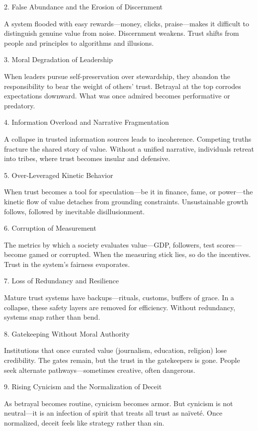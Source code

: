 \documentclass[11pt,oneside]{book}
\begin{document}
2. False Abundance and the Erosion of Discernment


A system flooded with easy rewards—money, clicks, praise—makes it difficult to distinguish genuine value from noise. Discernment weakens. Trust shifts from people and principles to algorithms and illusions.

3. Moral Degradation of Leadership


When leaders pursue self-preservation over stewardship, they abandon the responsibility to bear the weight of others’ trust. Betrayal at the top corrodes expectations downward. What was once admired becomes performative or predatory.

4. Information Overload and Narrative Fragmentation


A collapse in trusted information sources leads to incoherence. Competing truths fracture the shared story of value. Without a unified narrative, individuals retreat into tribes, where trust becomes insular and defensive.

5. Over-Leveraged Kinetic Behavior


When trust becomes a tool for speculation—be it in finance, fame, or power—the kinetic flow of value detaches from grounding constraints. Unsustainable growth follows, followed by inevitable disillusionment.

6. Corruption of Measurement


The metrics by which a society evaluates value—GDP, followers, test scores—become gamed or corrupted. When the measuring stick lies, so do the incentives. Trust in the system’s fairness evaporates.

7. Loss of Redundancy and Resilience


Mature trust systems have backups—rituals, customs, buffers of grace. In a collapse, these safety layers are removed for efficiency. Without redundancy, systems snap rather than bend.

8. Gatekeeping Without Moral Authority


Institutions that once curated value (journalism, education, religion) lose credibility. The gates remain, but the trust in the gatekeepers is gone. People seek alternate pathways—sometimes creative, often dangerous.

9. Rising Cynicism and the Normalization of Deceit


As betrayal becomes routine, cynicism becomes armor. But cynicism is not neutral—it is an infection of spirit that treats all trust as naïveté. Once normalized, deceit feels like strategy rather than sin.
\end{document}
